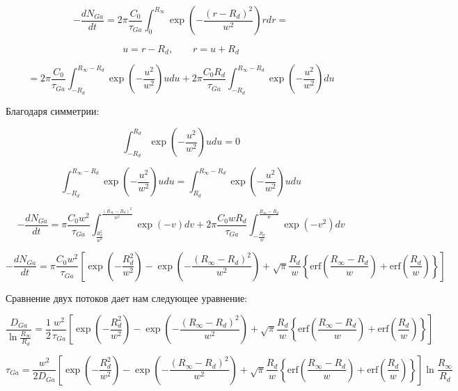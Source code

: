 \documentclass[14pt,oneside]{extarticle}
\begin{document}
\[
-\frac{dN_{Ga}}{dt}=2\pi\frac{C_{0}}{\tau_{Ga}}\int_{0}^{R_{\infty}}\exp\left(-\frac{\left(r-R_{d}\right)^{2}}{w^{2}}\right)rdr=
\]

\[
u=r-R_{d},\qquad r=u+R_{d}
\]

\begin{equation}
=2\pi\frac{C_{0}}{\tau_{Ga}}\int_{-R_{d}}^{R_{\infty}-R_{d}}\exp\left(-\frac{u^{2}}{w^{2}}\right)udu+2\pi\frac{C_{0}R_{d}}{\tau_{Ga}}\int_{-R_{d}}^{R_{\infty}-R_{d}}\exp\left(-\frac{u^{2}}{w^{2}}\right)du
\end{equation}

Благодаря симметрии:

\[
\int_{-R_{d}}^{R_{d}}\exp\left(-\frac{u^{2}}{w^{2}}\right)udu=0
\]

\[
\int_{-R_{d}}^{R_{\infty}-R_{d}}\exp\left(-\frac{u^{2}}{w^{2}}\right)udu=\int_{R_{d}}^{R_{\infty}-R_{d}}\exp\left(-\frac{u^{2}}{w^{2}}\right)udu
\]

\[
-\frac{dN_{Ga}}{dt}=\pi\frac{C_{0}w^{2}}{\tau_{Ga}}\int_{\frac{R_{d}^{2}}{w^{2}}}^{\frac{\left(R_{\infty}-R_{d}\right)^{2}}{w^{2}}}\exp\left(-v\right)dv+2\pi\frac{C_{0}wR_{d}}{\tau_{Ga}}\int_{-\frac{R_{d}}{w}}^{\frac{R_{\infty}-R_{d}}{w}}\exp\left(-v^{2}\right)dv
\]

\begin{equation}
-\frac{dN_{Ga}}{dt}=\pi\frac{C_{0}w^{2}}{\tau_{Ga}}\left[\exp\left(-\frac{R_{d}^{2}}{w^{2}}\right)-\exp\left(-\frac{\left(R_{\infty}-R_{d}\right)^{2}}{w^{2}}\right)+\sqrt{\pi}\frac{R_{d}}{w}\left\{ \text{erf}\left(\frac{R_{\infty}-R_{d}}{w}\right)+\text{erf}\left(\frac{R_{d}}{w}\right)\right\} \right]
\end{equation}

Сравнение двух потоков дает нам следующее уравнение:

\[
\frac{D_{Ga}}{\ln\frac{R_{\infty}}{R_{d}}}=\frac{1}{2}\frac{w^{2}}{\tau_{Ga}}\left[\exp\left(-\frac{R_{d}^{2}}{w^{2}}\right)-\exp\left(-\frac{\left(R_{\infty}-R_{d}\right)^{2}}{w^{2}}\right)+\sqrt{\pi}\frac{R_{d}}{w}\left\{ \text{erf}\left(\frac{R_{\infty}-R_{d}}{w}\right)+\text{erf}\left(\frac{R_{d}}{w}\right)\right\} \right]
\]

\begin{equation}
\tau_{Ga}=\frac{w^{2}}{2D_{Ga}}\left[\exp\left(-\frac{R_{d}^{2}}{w^{2}}\right)-\exp\left(-\frac{\left(R_{\infty}-R_{d}\right)^{2}}{w^{2}}\right)+\sqrt{\pi}\frac{R_{d}}{w}\left\{ \text{erf}\left(\frac{R_{\infty}-R_{d}}{w}\right)+\text{erf}\left(\frac{R_{d}}{w}\right)\right\} \right]\ln\frac{R_{\infty}}{R_{d}}
\end{equation}
\end{document}
